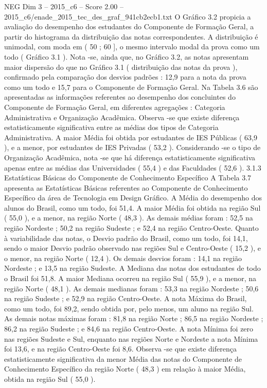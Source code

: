 \begin{textsample}{NEG Dim 3 – 2015\_c6 – Score 2.00 – 2015\_c6/enade\_2015\_tec\_des\_graf\_941cb2ecb1.txt}
O Gráfico 3.2 propicia a avaliação do desempenho dos estudantes do Componente de Formação Geral, a partir do histograma da distribuição das notas correspondentes.
A distribuição é unimodal, com moda em ( 50 ; 60 ], o mesmo intervalo modal da prova como um todo ( Gráfico 3.1 ).
Nota -se, ainda que, no Gráfico 3.2, as notas apresentam maior dispersão do que no Gráfico 3.1 ( distribuição das notas da prova ), confirmado pela comparação dos desvios padrões : 12,9 para a nota da prova como um todo e 15,7 para o Componente de Formação Geral.
Na Tabela 3.6 são apresentadas as informações referentes ao desempenho dos concluintes do Componente de Formação Geral, em diferentes agregações : Categoria Administrativa e Organização Acadêmica.
Observa -se que existe diferença estatisticamente significativa entre as médias dos tipos de Categoria Administrativa.
A maior Média foi obtida por estudantes de IES Públicas ( 63,9 ), e a menor, por estudantes de IES Privadas ( 53,2 ).
Considerando -se o tipo de Organização Acadêmica, nota -se que há diferença estatisticamente significativa apenas entre as médias das Universidades ( 55,4 ) e das Faculdades ( 52,6 ). 3.1.3 Estatísticas Básicas do Componente de Conhecimento Específico A Tabela 3.7 apresenta as Estatísticas Básicas referentes ao Componente de Conhecimento Específico da área de Tecnologia em Design Gráfico.
A Média do desempenho dos alunos do Brasil, como um todo, foi 51,4.
A maior Média foi obtida na região Sul ( 55,0 ), e a menor, na região Norte ( 48,3 ).
As demais médias foram : 52,5 na região Nordeste ; 50,2 na região Sudeste ; e 52,4 na região Centro-Oeste.
Quanto à variabilidade das notas, o Desvio padrão do Brasil, como um todo, foi 14,1, sendo o maior Desvio padrão observado nas regiões Sul e Centro-Oeste ( 15,2 ), e o menor, na região Norte ( 12,4 ).
Os demais desvios foram : 14,1 na região Nordeste ; e 13,5 na região Sudeste.
A Mediana das notas dos estudantes de todo o Brasil foi 51,8.
A maior Mediana ocorreu na região Sul ( 55,9 ), e a menor, na região Norte ( 48,1 ).
As demais medianas foram : 53,3 na região Nordeste ; 50,6 na região Sudeste ; e 52,9 na região Centro-Oeste.
A nota Máxima do Brasil, como um todo, foi 89,2, sendo obtida por, pelo menos, um aluno na região Sul.
As demais notas máximas foram : 81,8 na região Norte ; 86,5 na região Nordeste ; 86,2 na região Sudeste ; e 84,6 na região Centro-Oeste.
A nota Mínima foi zero nas regiões Sudeste e Sul, enquanto nas regiões Norte e Nordeste a nota Mínima foi 13,6, e na região Centro-Oeste foi 8,6.
Observa -se que existe diferença estatisticamente significativa da menor Média das notas do Componente de Conhecimento Específico da região Norte ( 48,3 ) em relação à maior Média, obtida na região Sul ( 55,0 ).

\end{textsample}
